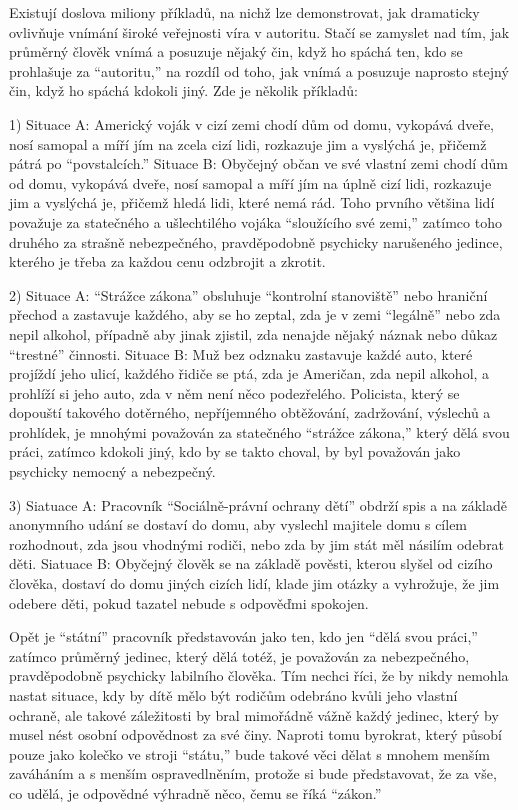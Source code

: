 \documentclass{book}
\begin{document}
Existují doslova miliony příkladů, na nichž lze demonstrovat, jak dramaticky ovlivňuje vnímání široké veřejnosti víra v autoritu. Stačí se zamyslet nad tím, jak průměrný člověk vnímá a posuzuje nějaký čin, když ho spáchá ten, kdo se prohlašuje za \enquote{autoritu,} na rozdíl od toho, jak vnímá a posuzuje naprosto stejný čin, když ho spáchá kdokoli jiný. Zde je několik příkladů:

1) Situace A: Americký voják v cizí zemi chodí dům od domu, vykopává dveře, nosí samopal a míří jím na zcela cizí lidi, rozkazuje jim a vyslýchá je, přičemž pátrá po \enquote{povstalcích.} Situace B: Obyčejný občan ve své vlastní zemi chodí dům od domu, vykopává dveře, nosí samopal a míří jím na úplně cizí lidi, rozkazuje jim a vyslýchá je, přičemž hledá lidi, které nemá rád. Toho prvního většina lidí považuje za statečného a ušlechtilého vojáka \enquote{sloužícího své zemi,} zatímco toho druhého za strašně nebezpečného, pravděpodobně psychicky narušeného jedince, kterého je třeba za každou cenu odzbrojit a zkrotit.

2) Situace A: \enquote{Strážce zákona} obsluhuje \enquote{kontrolní stanoviště} nebo hraniční přechod a zastavuje každého, aby se ho zeptal, zda je v zemi \enquote{legálně} nebo zda nepil alkohol, případně aby jinak zjistil, zda nenajde nějaký náznak nebo důkaz \enquote{trestné} činnosti. Situace B: Muž bez odznaku zastavuje každé auto, které projíždí jeho ulicí, každého řidiče se ptá, zda je Američan, zda nepil alkohol, a prohlíží si jeho auto, zda v něm není něco podezřelého. Policista, který se dopouští takového dotěrného, nepříjemného obtěžování, zadržování, výslechů a prohlídek, je mnohými považován za statečného \enquote{strážce zákona,} který dělá svou práci, zatímco kdokoli jiný, kdo by se takto choval, by byl považován jako psychicky nemocný a nebezpečný.

3) Siatuace A: Pracovník \enquote{Sociálně-právní ochrany dětí} obdrží spis a na základě anonymního udání se dostaví do domu, aby vyslechl majitele domu s cílem rozhodnout, zda jsou vhodnými rodiči, nebo zda by jim stát měl násilím odebrat děti. Siatuace B: Obyčejný člověk se na základě pověsti, kterou slyšel od cizího člověka, dostaví do domu jiných cizích lidí, klade jim otázky a vyhrožuje, že jim odebere děti, pokud tazatel nebude s odpověďmi spokojen.

Opět je \enquote{státní} pracovník představován jako ten, kdo jen \enquote{dělá svou práci,} zatímco průměrný jedinec, který dělá totéž, je považován za nebezpečného, pravděpodobně psychicky labilního člověka. Tím nechci říci, že by nikdy nemohla nastat situace, kdy by dítě mělo být rodičům odebráno kvůli jeho vlastní ochraně, ale takové záležitosti by bral mimořádně vážně každý jedinec, který by musel nést osobní odpovědnost za své činy. Naproti tomu byrokrat, který působí pouze jako kolečko ve stroji \enquote{státu,} bude takové věci dělat s mnohem menším zaváháním a s menším ospravedlněním, protože si bude představovat, že za vše, co udělá, je odpovědné výhradně něco, čemu se říká \enquote{zákon.}
\end{document}
